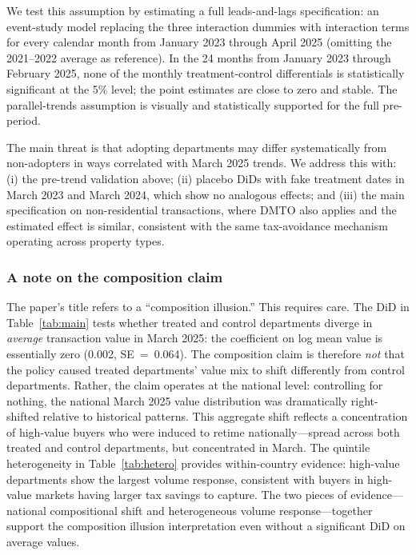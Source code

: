 \documentclass[12pt]{article}
\begin{document}
We test this assumption by estimating a full leads-and-lags specification: an event-study model
replacing the three interaction dummies with interaction terms for every calendar month from
January 2023 through April 2025 (omitting the 2021--2022 average as reference). In the 24
months from January 2023 through February 2025, none of the monthly treatment-control differentials
is statistically significant at the 5\% level; the point estimates are close to zero and stable.
The parallel-trends assumption is visually and statistically supported for the full pre-period.

The main threat is that adopting departments may differ systematically from non-adopters in ways
correlated with March 2025 trends. We address this with: (i) the pre-trend validation above;
(ii) placebo DiDs with fake treatment dates in March 2023 and March 2024, which show no
analogous effects; and (iii) the main specification on non-residential transactions, where
DMTO also applies and the estimated effect is similar, consistent with the same tax-avoidance
mechanism operating across property types.

\subsubsection*{A note on the composition claim}
The paper's title refers to a ``composition illusion.'' This requires care. The DiD in
Table~\ref{tab:main} tests whether treated and control departments diverge in \textit{average}
transaction value in March 2025: the coefficient on log mean value is essentially zero (0.002,
SE~=~0.064). The composition claim is therefore \textit{not} that the policy caused treated
departments' value mix to shift differently from control departments. Rather, the claim operates
at the national level: controlling for nothing, the national March 2025 value distribution
was dramatically right-shifted relative to historical patterns. This aggregate shift reflects
a concentration of high-value buyers who were induced to retime nationally---spread across both
treated and control departments, but concentrated in March. The quintile heterogeneity in
Table~\ref{tab:hetero} provides within-country evidence: high-value departments show the largest
volume response, consistent with buyers in high-value markets having larger tax savings to
capture. The two pieces of evidence---national compositional shift and heterogeneous volume
response---together support the composition illusion interpretation even without a significant
DiD on average values.
\end{document}
